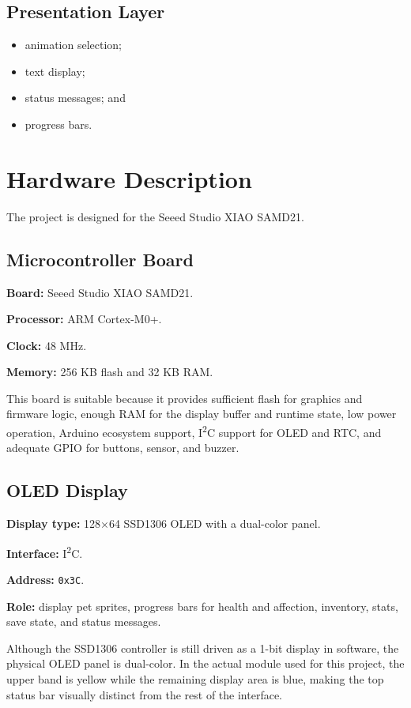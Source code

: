 \documentclass[conference]{IEEEtran}
\begin{document}
\subsection{Presentation Layer}
\begin{itemize}
\item animation selection;
\item text display;
\item status messages; and
\item progress bars.
\end{itemize}

\section{Hardware Description}
The project is designed for the Seeed Studio XIAO SAMD21.

\subsection{Microcontroller Board}
\textbf{Board:} Seeed Studio XIAO SAMD21.

\textbf{Processor:} ARM Cortex-M0+.

\textbf{Clock:} 48 MHz.

\textbf{Memory:} 256 KB flash and 32 KB RAM.

This board is suitable because it provides sufficient flash for graphics and firmware logic, enough RAM for the display buffer and runtime state, low power operation, Arduino ecosystem support, I\textsuperscript{2}C support for OLED and RTC, and adequate GPIO for buttons, sensor, and buzzer.

\subsection{OLED Display}
\textbf{Display type:} 128$\times$64 SSD1306 OLED with a dual-color panel.

\textbf{Interface:} I\textsuperscript{2}C.

\textbf{Address:} \texttt{0x3C}.

\textbf{Role:} display pet sprites, progress bars for health and affection, inventory, stats, save state, and status messages.

Although the SSD1306 controller is still driven as a 1-bit display in software, the physical OLED panel is dual-color. In the actual module used for this project, the upper band is yellow while the remaining display area is blue, making the top status bar visually distinct from the rest of the interface.
\end{document}
